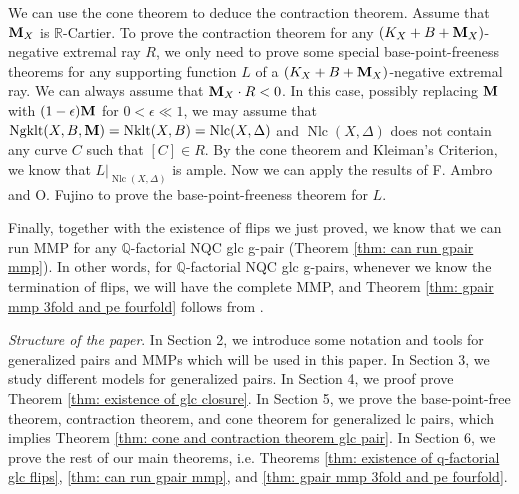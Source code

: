 \documentclass[11pt]{amsart}
\numberwithin{equation}{section}
\newcommand{\Mm}{{\bf{M}}}
\newcommand{\Qq}{\mathbb{Q}}
\newcommand{\Rr}{\mathbb{R}}
\newcommand{\Nklt}{\operatorname{Nklt}}
\newcommand{\Ngklt}{\operatorname{Ngklt}}
\newcommand{\Nlc}{\operatorname{Nlc}}
\theoremstyle{definition}
\theoremstyle{definition}
\theoremstyle{definition}
\begin{document}
We can use the cone theorem to deduce the contraction theorem. Assume that $\Mm_X$ is $\Rr$-Cartier. To prove the contraction theorem for any $(K_X+B+\Mm_X)$-negative extremal ray $R$, we only need to prove some special base-point-freeness theorems for any supporting function $L$ of a $(K_X+B+\Mm_X)$-negative extremal ray. We can always assume that $\Mm_X\cdot R<0$. In this case, possibly replacing $\Mm$ with $(1-\epsilon)\Mm$ for $0<\epsilon\ll 1$, we may assume that $\Ngklt(X,B,\Mm)=\Nklt(X,B)=\Nlc(X,\Delta)$ and $\Nlc(X,\Delta)$ does not contain any curve $C$ such that $[C]\in R$. By the cone theorem and Kleiman's Criterion, we know that $L|_{\Nlc(X,\Delta)}$ is ample. Now we can apply the results of F. Ambro \cite{Amb03} and O. Fujino \cite{Fuj11} to prove the base-point-freeness theorem for $L$. 

Finally, together with the existence of flips we just proved, we know that we can run MMP for any $\Qq$-factorial NQC glc g-pair (Theorem \ref{thm: can run gpair mmp}). In other words, for $\Qq$-factorial NQC glc g-pairs, whenever we know the termination of flips, we will have the complete MMP, and Theorem \ref{thm: gpair mmp 3fold and pe fourfold} follows from \cite{HM20,CT20}.

\medskip

\noindent\textit{Structure of the paper}. In Section 2, we introduce some notation and tools for generalized pairs and MMPs which will be used in this paper. In Section 3, we study different models for generalized pairs. In Section 4, we proof prove Theorem \ref{thm: existence of glc closure}. In Section 5, we prove the base-point-free theorem, contraction theorem, and cone theorem for generalized lc pairs, which implies Theorem \ref{thm: cone and contraction theorem glc pair}. In Section 6, we prove the rest of our main theorems, i.e. Theorems \ref{thm: existence of q-factorial glc flips}, \ref{thm: can run gpair mmp}, and \ref{thm: gpair mmp 3fold and pe fourfold}.

\medskip
\end{document}
